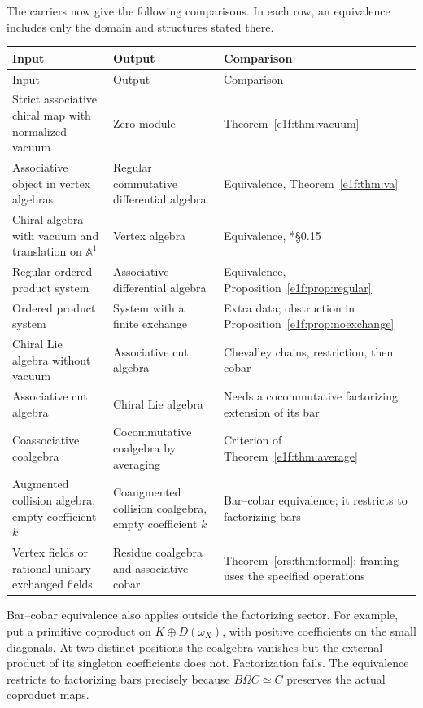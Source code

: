 The carriers now give the following comparisons. In
each row, an equivalence includes only the domain and
structures stated there.
\medskip
\begingroup
\renewcommand{\arraystretch}{1.2}
\begin{longtable}{
 >{\raggedright\arraybackslash}p{}
 >{\raggedright\arraybackslash}p{}
 >{\raggedright\arraybackslash}p{}}
\toprule
Input & Output & Comparison\\\midrule
\endfirsthead
\toprule
Input & Output & Comparison\\\midrule
\endhead
\bottomrule
\endfoot
Strict associative chiral map with normalized vacuum
 & Zero module & Theorem~\ref{e1f:thm:vacuum}\\
Associative object in vertex algebras
 & Regular commutative differential algebra
 & Equivalence, Theorem~\ref{e1f:thm:va}\\
Chiral algebra with vacuum and translation on \(\mathbb A^1\)
 & Vertex algebra & Equivalence, \cite{chhop:BD}*{\S0.15}\\
Regular ordered product system
 & Associative differential algebra
 & Equivalence, Proposition~\ref{e1f:prop:regular}\\
Ordered product system
 & System with a finite exchange
 & Extra data; obstruction in Proposition~\ref{e1f:prop:noexchange}\\
Chiral Lie algebra without vacuum
 & Associative cut algebra
 & Chevalley chains, restriction, then cobar\\
Associative cut algebra
 & Chiral Lie algebra
 & Needs a cocommutative factorizing extension of its bar\\
Coassociative coalgebra
 & Cocommutative coalgebra by averaging
 & Criterion of Theorem~\ref{e1f:thm:average}\\
Augmented collision algebra, empty coefficient \(k\)
 & Coaugmented collision coalgebra, empty coefficient \(k\)
 & Bar--cobar equivalence; it restricts to factorizing bars\\
Vertex fields or rational unitary exchanged fields
 & Residue coalgebra and associative cobar
 & Theorem~\ref{ors:thm:formal}; framing uses the specified operations\\
\end{longtable}
\endgroup
\medskip

Bar--cobar equivalence also applies outside the factorizing
sector. For example, put a primitive coproduct on
\(K\oplus D(\omega_X)\), with positive coefficients on
the small diagonals. At two distinct positions the
coalgebra vanishes but the external product of its
singleton coefficients does not. Factorization fails.
The equivalence restricts to factorizing bars precisely
because \(B\Omega C\simeq C\) preserves the actual
coproduct maps.

